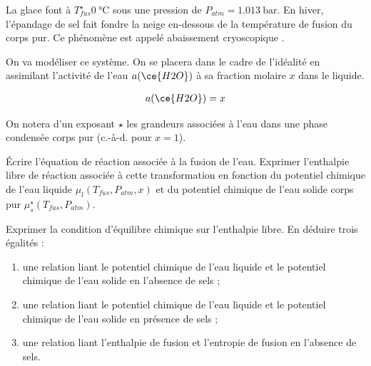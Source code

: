 \setcounter{equation}{0}
\setcounter{Q}{0}

La glace font à $T^\star_{fus}\SI{0}{\celsius}$ sous une pression de $P_{atm} = \SI{1.013}{\bar}$. En hiver, l'épandage de sel fait fondre la neige en-dessous de la température de fusion du corps pur. Ce phénomène est appelé \og abaissement cryoscopique \fg{}.

On va modéliser ce système. On se placera dans le cadre de l'idéalité en assimilant l'activité de l'eau $a ( \ce{H2O} )$ à sa fraction molaire $x$ dans le liquide.

\begin{align*}
a ( \ce{H2O} ) = x
\end{align*}

On notera d'un exposant $\star$ les grandeurs associées à l'eau dans une phase condensée corps pur (c.-à-d. pour $x = 1$).

\Q\label{Q:01} \'{E}crire l'équation de réaction associée à la fusion de l'eau. Exprimer l'enthalpie libre de réaction associée à cette transformation en fonction du potentiel chimique de l'eau liquide $\mu_l (T_{fus}, P_{atm}, x)$ et du potentiel chimique de l'eau solide corps pur $\mu^\star_s (T_{fus}, P_{atm})$.

\Q\label{Q:02} Exprimer la condition d'équilibre chimique sur l'enthalpie libre. En déduire trois égalités : 
\begin{enumerate}
\item une relation liant le potentiel chimique de l'eau liquide et le potentiel chimique de l'eau solide en l'absence de sels ;
\item une relation liant le potentiel chimique de l'eau liquide et le potentiel chimique de l'eau solide en présence de sels ;
\item une relation liant l'enthalpie de fusion et l'entropie de fusion en l'absence de sels.
\end{enumerate}

